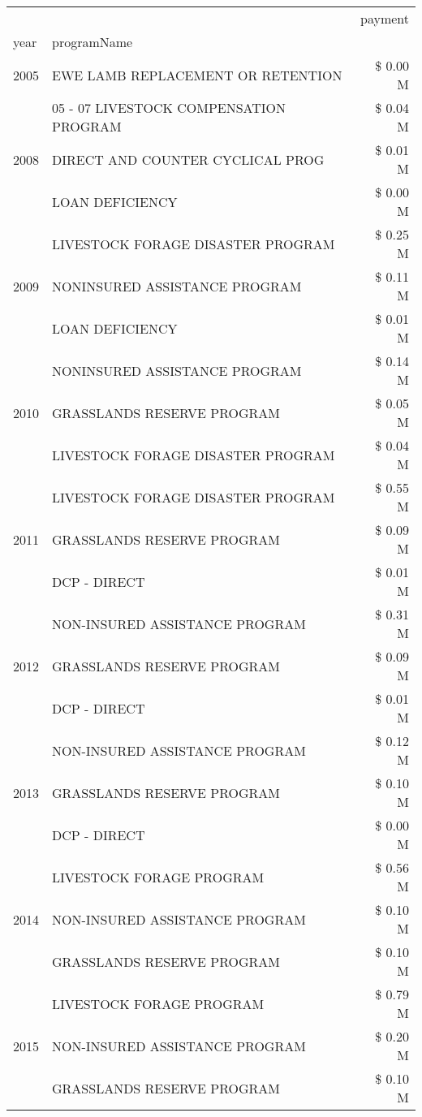 \begin{tabular}{llr}
\toprule
 &  & payment \\
year & programName &  \\
\midrule
2005 & EWE LAMB REPLACEMENT OR RETENTION & \$ 0.00 M \\
\cline{1-3}
\multirow[t]{3}{*}{2008} & 05 - 07 LIVESTOCK COMPENSATION PROGRAM & \$ 0.04 M \\
 & DIRECT AND COUNTER CYCLICAL PROG & \$ 0.01 M \\
 & LOAN DEFICIENCY & \$ 0.00 M \\
\cline{1-3}
\multirow[t]{3}{*}{2009} & LIVESTOCK FORAGE DISASTER  PROGRAM & \$ 0.25 M \\
 & NONINSURED ASSISTANCE PROGRAM & \$ 0.11 M \\
 & LOAN DEFICIENCY & \$ 0.01 M \\
\cline{1-3}
\multirow[t]{3}{*}{2010} & NONINSURED ASSISTANCE PROGRAM & \$ 0.14 M \\
 & GRASSLANDS RESERVE PROGRAM & \$ 0.05 M \\
 & LIVESTOCK FORAGE DISASTER PROGRAM & \$ 0.04 M \\
\cline{1-3}
\multirow[t]{3}{*}{2011} & LIVESTOCK FORAGE DISASTER PROGRAM & \$ 0.55 M \\
 & GRASSLANDS RESERVE PROGRAM & \$ 0.09 M \\
 & DCP - DIRECT & \$ 0.01 M \\
\cline{1-3}
\multirow[t]{3}{*}{2012} & NON-INSURED ASSISTANCE PROGRAM & \$ 0.31 M \\
 & GRASSLANDS RESERVE PROGRAM & \$ 0.09 M \\
 & DCP - DIRECT & \$ 0.01 M \\
\cline{1-3}
\multirow[t]{3}{*}{2013} & NON-INSURED ASSISTANCE PROGRAM & \$ 0.12 M \\
 & GRASSLANDS RESERVE PROGRAM & \$ 0.10 M \\
 & DCP - DIRECT & \$ 0.00 M \\
\cline{1-3}
\multirow[t]{3}{*}{2014} & LIVESTOCK FORAGE PROGRAM & \$ 0.56 M \\
 & NON-INSURED ASSISTANCE PROGRAM & \$ 0.10 M \\
 & GRASSLANDS RESERVE PROGRAM & \$ 0.10 M \\
\cline{1-3}
\multirow[t]{3}{*}{2015} & LIVESTOCK FORAGE PROGRAM & \$ 0.79 M \\
 & NON-INSURED ASSISTANCE PROGRAM & \$ 0.20 M \\
 & GRASSLANDS RESERVE PROGRAM & \$ 0.10 M \\

\end{tabular}

